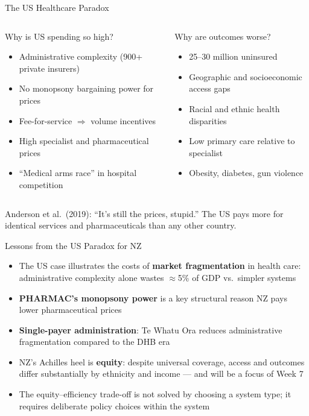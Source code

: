 \documentclass[aspectratio=169, 12pt]{beamer}
\begin{document}
\begin{frame}{The US Healthcare Paradox}
  \begin{columns}
      \begin{block}{Why is US spending so high?}
        \footnotesize
        \begin{itemize}
          \item Administrative complexity (900+ private insurers)
          \item No monopsony bargaining power for prices
          \item Fee-for-service $\Rightarrow$ volume incentives
          \item High specialist and pharmaceutical prices
          \item ``Medical arms race'' in hospital competition
        \end{itemize}
      \end{block}
      \begin{alertblock}{Why are outcomes worse?}
        \footnotesize
        \begin{itemize}
          \item 25--30 million uninsured
          \item Geographic and socioeconomic access gaps
          \item Racial and ethnic health disparities
          \item Low primary care relative to specialist
          \item Obesity, diabetes, gun violence
        \end{itemize}
      \end{alertblock}
  \end{columns}
  {\footnotesize Anderson et al.\ (2019): ``It's still the prices, stupid.'' The US pays more for identical services and pharmaceuticals than any other country.}
\end{frame}

\begin{frame}{Lessons from the US Paradox for NZ}
  \begin{itemize}
    \item The US case illustrates the costs of \textbf{market fragmentation} in health care:
          administrative complexity alone wastes $\approx$5\% of GDP vs.\ simpler systems
    \item \textbf{PHARMAC's monopsony power} is a key structural reason NZ pays lower pharmaceutical prices
    \item \textbf{Single-payer administration}: Te Whatu Ora reduces administrative fragmentation
          compared to the DHB era
    \item NZ's Achilles heel is \textbf{equity}: despite universal coverage, access and outcomes
          differ substantially by ethnicity and income --- and will be a focus of Week 7
    \item The equity--efficiency trade-off is not solved by choosing a system type;
          it requires deliberate policy choices within the system
  \end{itemize}
\end{frame}
\end{document}
